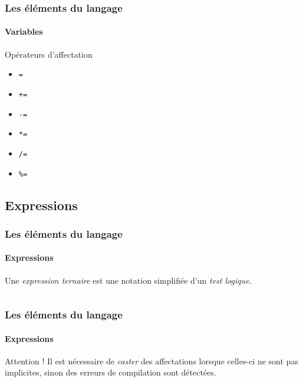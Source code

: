 		\begin{frame}[fragile]
			\frametitle{Les éléments du langage}
			\framesubtitle{Variables}
			
			\begin{block}{Opérateurs d'affectation}
				\begin{itemize}
					\item \lstinline|=|
					\item \lstinline|+=|
					\item \lstinline|-=|
					\item \lstinline|*=|
					\item \lstinline|/=|
					\item \lstinline|%=|
				\end{itemize}
			\end{block}		
		\end{frame}
	
	\subsection{Expressions}
	
		\begin{frame}[fragile]
			\frametitle{Les éléments du langage}
			\framesubtitle{Expressions}
			\begin{definition}
				Une \emph{expression ternaire} est une notation \og simplifiée\fg{} d'un \emph{test logique}.
			\end{definition}
			\begin{columns}
				\begin{column}{0.45\textwidth}
					\pause{}
					\begin{example}
						
					\end{example}
				\end{column}
				\begin{column}{0.45\textwidth}
					\pause{}
					\begin{example}
						
					\end{example}
				\end{column}
			\end{columns}	
		\end{frame}
	
		\begin{frame}[fragile]
			\frametitle{Les éléments du langage}
			\framesubtitle{Expressions}
			\begin{alertblock}{Attention !}
				Il est nécessaire de \emph{caster} des affectations lorsque celles-ci ne sont pas implicites, sinon des erreurs de compilation sont détectées.
			\end{alertblock}
			\pause{}
			\begin{example}
				
			\end{example}
			
		\end{frame}
	
